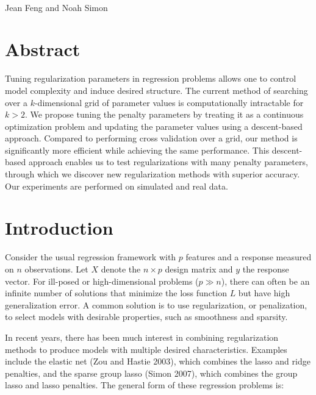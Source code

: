 \documentclass[10pt,letterpaper]{article}
\date{}
\begin{document}
\vspace*{0.35in}

\begin{flushleft}
{\Large
\textbf{}
}
\newline
\\
Jean Feng and Noah Simon
\\

\end{flushleft}
\section*{Abstract}
Tuning regularization parameters in regression problems allows one to control model complexity and induce desired structure. The current method of searching over a $k$-dimensional grid of parameter values is computationally intractable for $k>2$. We propose tuning the penalty parameters by treating it as a continuous optimization problem and updating the parameter values using a descent-based approach. Compared to performing cross validation over a grid, our method is significantly more efficient while achieving the same performance. This descent-based approach enables us to test regularizations with many penalty parameters, through which we discover new regularization methods with superior accuracy. Our experiments are performed on simulated and real data.

\section{Introduction}

Consider the usual regression framework with $p$ features and a response measured on $n$ observations. Let $X$ denote the $n \times p$ design matrix and $y$ the response vector. For ill-posed or high-dimensional problems ($p \gg n$), there can often be an infinite number of solutions that minimize the loss function $L$ but have high generalization error. A common solution is to use regularization, or penalization, to select models with desirable properties, such as smoothness and sparsity.

In recent years, there has been much interest in combining regularization methods to produce models with multiple desired characteristics. Examples include the elastic net (Zou and Hastie 2003), which combines the lasso and ridge penalties, and the sparse group lasso (Simon 2007), which combines the group lasso and lasso penalties. The general form of these regression problems is:
\end{document}
